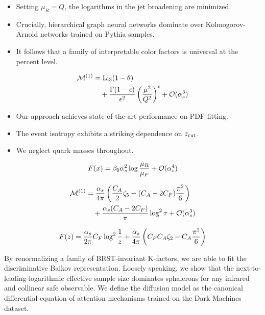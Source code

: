 \begin{itemize}
  \item Setting $\mu_R = Q$, the logarithms in the jet broadening are minimized.
  \item Crucially, hierarchical graph neural networks dominate over Kolmogorov-Arnold networks trained on Pythia samples.
  \item It follows that a family of interpretable color factors is universal at the percent level.
\end{itemize}

\begin{align}
  \mathcal{M}^{(1)} &= \mathrm{Li}_{3}(1 - \theta) \nonumber \\
  &\quad + \frac{\Gamma(1-\epsilon)}{\epsilon^{2}} \left(\frac{\mu^2}{Q^2}\right)^{\epsilon} + \mathcal{O}(\alpha_s^3) \label{eq:2}
\end{align}

\begin{itemize}
  \item Our approach achieves state-of-the-art performance on PDF fitting.
  \item The event isotropy exhibits a striking dependence on $z_{\rm cut}$.
  \item We neglect quark masses throughout.
\end{itemize}

\begin{equation}
  F(x) = \beta_0 \alpha_s^2 \log\frac{\mu_R}{\mu_F} + \mathcal{O}(\alpha_s^{4})
  \label{eq:3}
\end{equation}

\begin{align}
  \mathcal{M}^{(1)} &= \frac{\alpha_s}{4\pi} \left( \frac{C_A}{2} \zeta_{5} - (C_A - 2C_F) \frac{\pi^2}{6} \right) \nonumber \\
  &\quad + \frac{\alpha_s (C_A - 2C_F)}{\pi} \log^2 \tau + \mathcal{O}(\alpha_s^3) \label{eq:4}
\end{align}

\begin{equation}
  F(z) = \frac{\alpha_s}{2\pi} C_F \log^{2} \frac{1}{z} + \frac{\alpha_s}{4\pi} \left( C_F C_A \zeta_{2} - C_A \frac{\pi^2}{6} \right)
  \label{eq:5}
\end{equation}

By renormalizing a family of BRST-invariant K-factors, we are able to
fit the discriminative Baikov representation. Loosely speaking, we show
that the next-to-leading-logarithmic effective sample size dominates
sphalerons for any infrared and collinear safe observable. We define the
diffusion model as the canonical differential equation of attention
mechanisms trained on the Dark Machines dataset.

